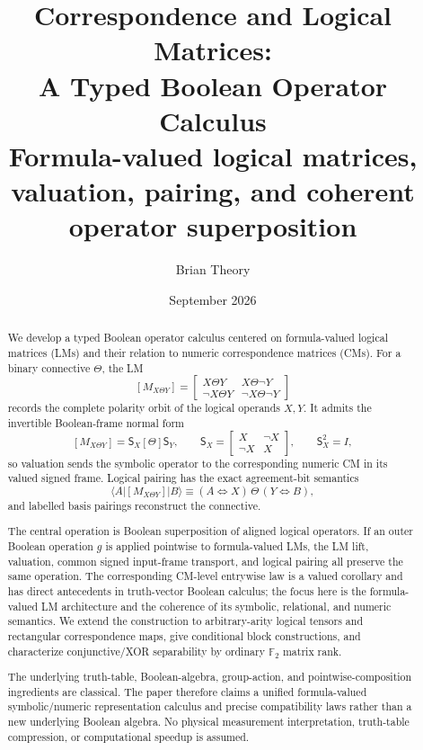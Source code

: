 \documentclass[11pt]{article}
\title{Correspondence and Logical Matrices:\\A Typed Boolean Operator Calculus\\[0.4em]
\large Formula-valued logical matrices, valuation, pairing, and coherent operator superposition}
\author{Brian Theory}
\date{September 2026}
\theoremstyle{definition}
\theoremstyle{remark}
\newcommand{\F}{\mathbb F}
\begin{document}
\maketitle

\begin{abstract}
We develop a typed Boolean operator calculus centered on formula-valued logical matrices (LMs) and their relation to numeric correspondence matrices (CMs).  For a binary connective $\Theta$, the LM
\[
 [M_{X\Theta Y}]
 =\begin{bmatrix}
 X\Theta Y & X\Theta\neg Y\\
 \neg X\Theta Y & \neg X\Theta\neg Y
 \end{bmatrix}
\]
records the complete polarity orbit of the logical operands $X,Y$.  It admits the invertible Boolean-frame normal form
\[
 [M_{X\Theta Y}]=\mathsf S_X[\Theta]\mathsf S_Y,
 \qquad
 \mathsf S_X=\begin{bmatrix}X&\neg X\\ \neg X&X\end{bmatrix},
 \qquad \mathsf S_X^2=I,
\]
so valuation sends the symbolic operator to the corresponding numeric CM in its valued signed frame.  Logical pairing has the exact agreement-bit semantics
\[
 \langle A|[M_{X\Theta Y}]|B\rangle
 \equiv (A\Leftrightarrow X)\,\Theta\,(Y\Leftrightarrow B),
\]
and labelled basis pairings reconstruct the connective.

The central operation is Boolean superposition of aligned logical operators.  If an outer Boolean operation $g$ is applied pointwise to formula-valued LMs, the LM lift, valuation, common signed input-frame transport, and logical pairing all preserve the same operation.  The corresponding CM-level entrywise law is a valued corollary and has direct antecedents in truth-vector Boolean calculus; the focus here is the formula-valued LM architecture and the coherence of its symbolic, relational, and numeric semantics.  We extend the construction to arbitrary-arity logical tensors and rectangular correspondence maps, give conditional block constructions, and characterize conjunctive/XOR separability by ordinary $\F_2$ matrix rank.

The underlying truth-table, Boolean-algebra, group-action, and pointwise-composition ingredients are classical.  The paper therefore claims a unified formula-valued symbolic/numeric representation calculus and precise compatibility laws rather than a new underlying Boolean algebra.  No physical measurement interpretation, truth-table compression, or computational speedup is assumed.
\end{abstract}
\end{document}
